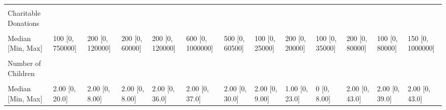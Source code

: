\documentclass[
  single column]{article}
\begin{document}
\begin{landscape}
\begin{longtable}[t]{lllllllllllll}
\cellcolor{gray!10}{Missing} & \cellcolor{gray!10}{25 (0.1\%)} & \cellcolor{gray!10}{2 (0.1\%)} & \cellcolor{gray!10}{1 (0.4\%)} & \cellcolor{gray!10}{1 (0.0\%)} & \cellcolor{gray!10}{10 (0.3\%)} & \cellcolor{gray!10}{0 (0\%)} & \cellcolor{gray!10}{0 (0\%)} & \cellcolor{gray!10}{0 (0\%)} & \cellcolor{gray!10}{37 (5.6\%)} & \cellcolor{gray!10}{1 (0.2\%)} & \cellcolor{gray!10}{2 (0.3\%)} & \cellcolor{gray!10}{79 (0.2\%)}\\
\addlinespace
Charitable Donations &  &  &  &  &  &  &  &  &  &  &  & \\
\cellcolor{gray!10}{Mean (SD)} & \cellcolor{gray!10}{705 (6140)} & \cellcolor{gray!10}{1490 (5870)} & \cellcolor{gray!10}{1140 (4480)} & \cellcolor{gray!10}{956 (3930)} & \cellcolor{gray!10}{3570 (18500)} & \cellcolor{gray!10}{2750 (5270)} & \cellcolor{gray!10}{1210 (3330)} & \cellcolor{gray!10}{1590 (3570)} & \cellcolor{gray!10}{849 (2350)} & \cellcolor{gray!10}{1180 (4510)} & \cellcolor{gray!10}{674 (3520)} & \cellcolor{gray!10}{1160 (8300)}\\
Median [Min, Max] & 100 [0, 750000] & 200 [0, 120000] & 200 [0, 60000] & 200 [0, 120000] & 600 [0, 1000000] & 500 [0, 60500] & 100 [0, 25000] & 200 [0, 20000] & 100 [0, 35000] & 200 [0, 80000] & 100 [0, 80000] & 150 [0, 1000000]\\
\cellcolor{gray!10}{Missing} & \cellcolor{gray!10}{77 (0.4\%)} & \cellcolor{gray!10}{65 (4.8\%)} & \cellcolor{gray!10}{12 (4.4\%)} & \cellcolor{gray!10}{92 (4.6\%)} & \cellcolor{gray!10}{151 (4.1\%)} & \cellcolor{gray!10}{47 (4.3\%)} & \cellcolor{gray!10}{7 (5.1\%)} & \cellcolor{gray!10}{5 (5.7\%)} & \cellcolor{gray!10}{13 (2.0\%)} & \cellcolor{gray!10}{38 (6.6\%)} & \cellcolor{gray!10}{42 (5.6\%)} & \cellcolor{gray!10}{549 (1.7\%)}\\
Number of Children &  &  &  &  &  &  &  &  &  &  &  & \\
\addlinespace
\cellcolor{gray!10}{Mean (SD)} & \cellcolor{gray!10}{1.52 (1.39)} & \cellcolor{gray!10}{2.13 (1.30)} & \cellcolor{gray!10}{1.46 (1.35)} & \cellcolor{gray!10}{2.12 (1.85)} & \cellcolor{gray!10}{1.98 (1.76)} & \cellcolor{gray!10}{2.32 (1.92)} & \cellcolor{gray!10}{1.44 (1.47)} & \cellcolor{gray!10}{1.72 (2.67)} & \cellcolor{gray!10}{1.20 (1.58)} & \cellcolor{gray!10}{2.22 (2.17)} & \cellcolor{gray!10}{1.78 (2.15)} & \cellcolor{gray!10}{1.68 (1.55)}\\
Median [Min, Max] & 2.00 [0, 20.0] & 2.00 [0, 8.00] & 2.00 [0, 8.00] & 2.00 [0, 36.0] & 2.00 [0, 37.0] & 2.00 [0, 30.0] & 2.00 [0, 9.00] & 1.00 [0, 23.0] & 0 [0, 8.00] & 2.00 [0, 43.0] & 2.00 [0, 39.0] & 2.00 [0, 43.0]\\

\end{longtable}
\end{landscape}
\end{document}
